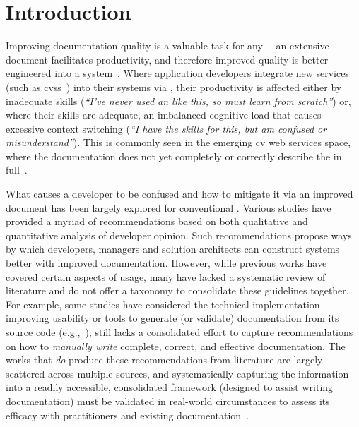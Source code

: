 \section{Introduction}

Improving  documentation quality is a valuable task for any ---an extensive  document facilitates productivity, and therefore improved quality is better engineered into a system~\citep{mcleod2011factors}. Where application developers integrate new services (such as \glspl{cvs}~\citep{Cummaudo:2019icsme}) into their systems via , their productivity is affected either by inadequate skills (\textit{``I've never used an  like this, so must learn from scratch''}) or, where their skills are adequate, an imbalanced cognitive load that causes excessive context switching (\textit{``I have the skills for this, but am confused or misunderstand''}). This is commonly seen in the emerging \gls{cv} web services space, where the documentation does not yet completely or correctly describe the  in full~\citep{Cummaudo:2020icse}. 

What causes a developer to be confused and how to mitigate it via an improved  document has been largely explored for conventional . Various studies have provided a myriad of recommendations based on both qualitative and quantitative analysis of developer opinion. Such recommendations propose ways by which developers, managers and solution architects can construct systems better with improved documentation. However, while previous works have covered certain aspects of  usage, many have lacked a systematic review of literature and do not offer a taxonomy to consolidate these guidelines together. For example, some studies have considered the technical implementation improving  usability or tools to generate (or validate)  documentation from its source code (e.g.,~\citep{Nybom:2018ef,Watson:2012uy,Maalej2013}); still lacks a consolidated effort to capture recommendations on how to \textit{manually write} complete, correct, and effective  documentation. The works that \textit{do} produce these recommendations from literature are largely scattered across multiple sources, and systematically capturing the information into a readily accessible, consolidated framework (designed to assist writing  documentation) must be validated in real-world circumstances to assess its efficacy with practitioners and existing documentation~\citep{Cummaudo:2019esem}.

